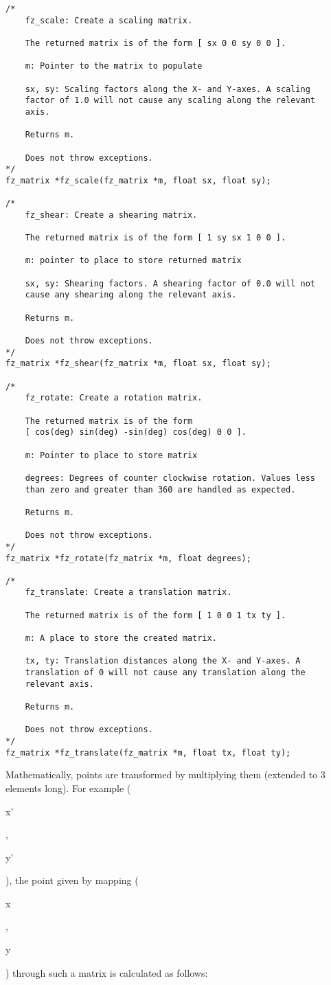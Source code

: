 \documentclass[oneside]{book}
\begin{document}
\begin{lstlisting}
/*
	fz_scale: Create a scaling matrix.

	The returned matrix is of the form [ sx 0 0 sy 0 0 ].

	m: Pointer to the matrix to populate

	sx, sy: Scaling factors along the X- and Y-axes. A scaling
	factor of 1.0 will not cause any scaling along the relevant
	axis.

	Returns m.

	Does not throw exceptions.
*/
fz_matrix *fz_scale(fz_matrix *m, float sx, float sy);

/*
	fz_shear: Create a shearing matrix.

	The returned matrix is of the form [ 1 sy sx 1 0 0 ].

	m: pointer to place to store returned matrix

	sx, sy: Shearing factors. A shearing factor of 0.0 will not
	cause any shearing along the relevant axis.

	Returns m.

	Does not throw exceptions.
*/
fz_matrix *fz_shear(fz_matrix *m, float sx, float sy);

/*
	fz_rotate: Create a rotation matrix.

	The returned matrix is of the form
	[ cos(deg) sin(deg) -sin(deg) cos(deg) 0 0 ].

	m: Pointer to place to store matrix

	degrees: Degrees of counter clockwise rotation. Values less
	than zero and greater than 360 are handled as expected.

	Returns m.

	Does not throw exceptions.
*/
fz_matrix *fz_rotate(fz_matrix *m, float degrees);

/*
	fz_translate: Create a translation matrix.

	The returned matrix is of the form [ 1 0 0 1 tx ty ].

	m: A place to store the created matrix.

	tx, ty: Translation distances along the X- and Y-axes. A
	translation of 0 will not cause any translation along the
	relevant axis.

	Returns m.

	Does not throw exceptions.
*/
fz_matrix *fz_translate(fz_matrix *m, float tx, float ty);
\end{lstlisting}

Mathematically, points are transformed by multiplying them (extended to 3 elements long). For example (\begin{tt}x'\end{tt},\begin{tt}y'\end{tt}), the point given by mapping (\begin{tt}x\end{tt},\begin{tt}y\end{tt}) through such a matrix is calculated as follows:
\end{document}
